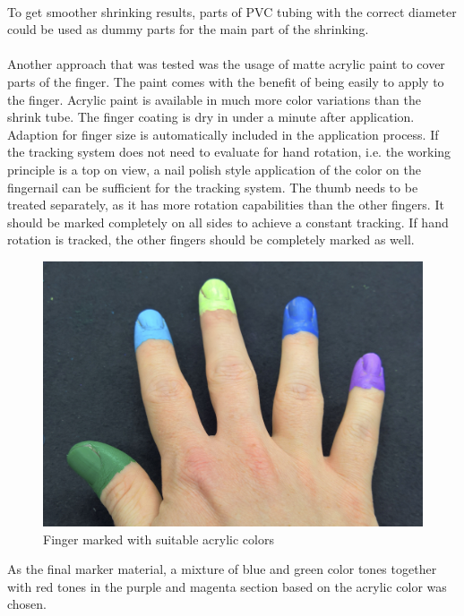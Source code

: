 \\To get smoother shrinking results, parts of PVC tubing with the correct diameter could be used as dummy parts for the main part of the shrinking.\\
\\Another approach that was tested was the usage of matte acrylic paint to cover parts of the finger. The paint comes with the benefit of being easily to apply to the finger. Acrylic paint is available in much more color variations than the shrink tube. The finger coating is dry in under a minute after application. Adaption for finger size is automatically included in the application process. If the tracking system does not need to evaluate for hand rotation, i.e. the working principle is a top on view, a nail polish style application of the color on the fingernail can be sufficient for the tracking system. The thumb needs to be treated separately, as it has more rotation capabilities than the other fingers. It should be marked completely on all sides to achieve a constant tracking. If hand rotation is tracked, the other fingers should be completely marked as well.
\begin{figure}[H]
\centering
\includegraphics[width=\textwidth/2]{images/final_finger_markers.jpg}
\caption{Finger marked with suitable acrylic colors}
\label{img:final_markers}
\end{figure}
\newpage As the final marker material, a mixture of blue and green color tones together with red tones in the purple and magenta section based on the acrylic color was chosen.
